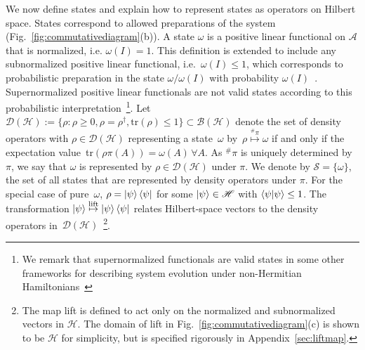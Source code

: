 \documentclass[amsmath,amssymb,aps,pra,superscriptaddress,twocolumn]{revtex4-2}
\begin{document}
We now define states and explain how to represent states as operators on Hilbert space.
States correspond to allowed preparations of the system
(Fig.~\ref{fig:commutativediagram}(b)).
A state $\omega$ is a positive linear functional on $\mathcal{A}$
that is normalized, i.e. $\omega(I) = 1$.
This definition is extended to include any subnormalized positive linear functional,
i.e.\ $\omega(I)\le 1$, which corresponds to probabilistic preparation in the state 
$\omega/\omega(I)$ with probability $\omega(I)$~\cite{Gud79}.
Supernormalized positive linear functionals are not valid states
according to this probabilistic interpretation~\footnote{
We remark that supernormalized functionals are valid states in some other frameworks
for describing system evolution under non-Hermitian Hamiltonians~\cite{Mos07,GKN10,UGRM12}
}.
Let $\mathcal{D}(\mathscr{H}):= \{\rho:\rho \ge 0,\rho=\rho^\dagger,
\text{tr}(\rho)\leq 1\} \subset \mathcal{B}(\mathscr{H})$ denote the set of density operators
with $\rho\in \mathcal{D}(\mathscr H)$ representing a state~$\omega$ 
by~$\rho\stackrel{\!\!{}^{\#}\!\!\pi}{\mapsto}\omega$
if and only if the expectation value~tr$(\rho\pi(A)) = \omega(A)\,\forall A$.
As ${}^\#\pi$ is uniquely determined by $\pi$, we say
that $\omega$ is represented by $\rho\in \mathcal{D}(\mathscr H)$ under $\pi$. 
We denote by  $\mathcal{S} = \{\omega\}$, the set of all states that are represented by density operators under $\pi$.
For the special case of pure~$\omega$,
$\rho = \ket{\psi}\bra{\psi}$ for some $\ket{\psi}\in \mathscr H$ with $\braket{\psi | \psi} \le 1$.
The transformation $\ket{\psi}\stackrel{\operatorname{lift}}{\mapsto}\ket{\psi}\bra{\psi}$ relates Hilbert-space
vectors to the density operators in~$\mathcal{D}(\mathscr H)$~\footnote{
The map lift is defined to act only on the normalized and subnormalized vectors in $\mathscr{H}$.
The domain of lift in Fig.~\ref{fig:commutativediagram}(c) is shown to be $\mathscr{H}$ for simplicity, but is specified 
rigorously in Appendix~\ref{sec:liftmap}.
}.
\end{document}
